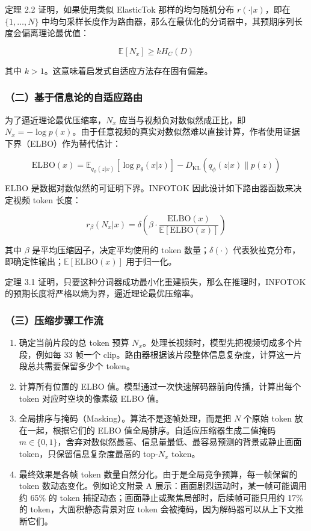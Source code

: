 定理 2.2 证明，如果使用类似 ElasticTok 那样的均匀随机分布 \(r(\cdot|x)\)，即在 \(\{1,\ldots,N\}\) 中均匀采样长度作为路由器，那么在最优化的分词器中，其预期序列长度会偏离理论最优值：

\[
\mathbb{E}[N_x]\ge kH_C(D)
\]

其中 \(k\gt 1\)。这意味着启发式自适应方法存在固有偏差。

\hypertarget{ux4e8cux57faux4e8eux4fe1ux606fux8bbaux7684ux81eaux9002ux5e94ux8defux7531}{%
\subsubsection{（二）基于信息论的自适应路由}\label{ux4e8cux57faux4e8eux4fe1ux606fux8bbaux7684ux81eaux9002ux5e94ux8defux7531}}

为了逼近理论最优压缩率，\(N_x\) 应当与视频负对数似然成正比，即 \(N_x=-\log p(x)\)。由于任意视频的真实对数似然难以直接计算，作者使用证据下界（ELBO）作为替代估计：

\[
\mathrm{ELBO}(x) =
\mathbb{E}_{q_\phi(z|x)}[\log p_\theta(x|z)] -
D_{\mathrm{KL}}(q_\phi(z|x)\|p(z))
\]

ELBO 是数据对数似然的可证明下界。INFOTOK 因此设计如下路由器函数来决定视频 token 长度：

\[
r_\beta(N_x|x) =
\delta\left(
\beta\cdot
\frac{\mathrm{ELBO}(x)}
{\mathbb{E}[\mathrm{ELBO}(x)]}
\right)
\]

其中 \(\beta\) 是平均压缩因子，决定平均使用的 token 数量；\(\delta(\cdot)\) 代表狄拉克分布，即确定性输出；\(\mathbb{E}[\mathrm{ELBO}(x)]\) 用于归一化。

定理 3.1 证明，只要这种分词器成功最小化重建损失，那么在推理时，INFOTOK 的预期长度将严格以熵为界，逼近理论最优压缩率。

\hypertarget{ux4e09ux538bux7f29ux6b65ux9aa4ux5de5ux4f5cux6d41}{%
\subsubsection{（三）压缩步骤工作流}\label{ux4e09ux538bux7f29ux6b65ux9aa4ux5de5ux4f5cux6d41}}

\begin{enumerate}
\def\labelenumi{\arabic{enumi}.}
\tightlist
\item
  确定当前片段的总 token 预算 \(N_x\)。处理长视频时，模型先把视频切成多个片段，例如每 33 帧一个 clip。路由器根据该片段整体信息复杂度，计算这一片段总共需要保留多少个 token。
\item
  计算所有位置的 ELBO 值。模型通过一次快速解码器前向传播，计算出每个 token 对应时空块的像素级 ELBO 值。
\item
  全局排序与掩码（Masking）。算法不是逐帧处理，而是把 \(N\) 个原始 token 放在一起，根据它们的 ELBO 值全局排序。自适应压缩器生成二值掩码 \(m\in\{0,1\}\)，舍弃对数似然最高、信息量最低、最容易预测的背景或静止画面 token，只保留信息复杂度最高的 top-\(N_x\) token。
\item
  最终效果是各帧 token 数量自然分化。由于是全局竞争预算，每一帧保留的 token 数动态变化。例如论文附录 A 展示：画面剧烈运动时，某一帧可能调用约 65\% 的 token 捕捉动态；画面静止或聚焦局部时，后续帧可能只用约 17\% 的 token，大面积静态背景对应 token 会被掩码，因为解码器可以从上下文推断它们。
\end{enumerate}

